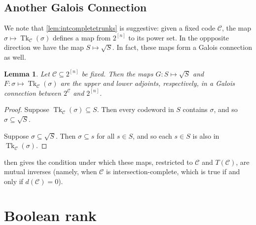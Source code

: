 \documentclass[11pt,letterpaper, reqno]{amsart}
\newtheorem{lem}[thm]{Lemma}         %
\theoremstyle{definition}
\DeclareMathOperator{\tk}{Tk}
\def\cC{\mathcal{C}}
\begin{document}
    \subsection{Another Galois Connection}
        We note that \cref{lem:intcompletetrunks} is suggestive: given a fixed code $\cC$, the map $\sigma \mapsto \tk_\cC(\sigma)$ defines a map from $2^{[n]}$ to its power set. In the oppposite direction we have the map $S \mapsto \sqrt{S}$. In fact, these maps form a Galois connection as well.
        \begin{lem}
            Let $\cC\subseteq 2^{[n]}$ be fixed. Then the maps $G: S \mapsto \sqrt{S}$ and $F: \sigma \mapsto \tk_\cC(\sigma)$ are the upper and lower adjoints, respectively, in a Galois connection between $2^\cC$ and $2^{[n]}$.
        \end{lem}
        \begin{proof}
            Suppose $\tk_\cC(\sigma) \subseteq S$. Then every codeword in $S$ contains $\sigma$, and so $\sigma \subseteq \sqrt{S}$.

            Suppose $\sigma \subseteq \sqrt{S}$. Then $\sigma \subseteq s$ for all $s \in S$, and so each $s\in S$ is also in $\tk_\cC(\sigma)$.
        \end{proof}
         then gives the condition under which these maps, restricted to $\cC$ and $T(\cC)$, are mutual inverses (namely, when $\cC$ is intersection-complete, which is true if and only if $d(\cC) = 0$).
        
        
        
\section{Boolean rank}\label{sec:booleanrank}
\end{document}
